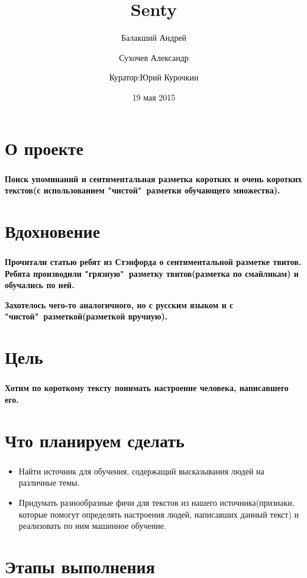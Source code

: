 \documentclass[t]{beamer}
\title{Senty}
\author{Балакший Андрей \and Сухочев Александр 
	\and \newline Куратор:Юрий Курочкин}
\date{19 мая 2015}
\institute[Computer Science Center]
\begin{document}
	\frame[plain]{\titlepage}
	
	
	\section{О проекте}
	\begin{frame}
		\frametitle{\insertsection}
		\textbf{Поиск упоминаний и сентиментальная разметка коротких и 	очень коротких текстов(с использованием "чистой"\ разметки обучающего множества).}
	\end{frame}
	
	
	\section{Вдохновение}
	\begin{frame}
		\frametitle{\insertsection}
		\textbf{Прочитали статью ребят из Стэнфорда о сентиментальной разметке твитов. Ребята производили "грязную"\ разметку твитов(разметка по смайликам) и обучались по ней.}\pause
		
		\textbf{Захотелось чего-то аналогичного, но с русским языком и с "чистой"\ разметкой(разметкой вручную).}
	\end{frame}
	
	
	\section{Цель}
	\begin{frame}
		\frametitle{\insertsection}
		\textbf{Хотим по короткому тексту понимать настроение человека, написавшего его.}
	\end{frame}
	
	
	\section{Что планируем сделать}
	\begin{frame}
		\frametitle{\insertsection}
		\begin{itemize}
			\item Найти источник для обучения, содержащий высказывания людей на различные темы.	
			\item Придумать разнообразные фичи для текстов из нашего источника(признаки, которые помогут определять настроения людей, написавших данный текст) и реализовать по ним машинное обучение.
		\end{itemize}
	\end{frame}
	
	
	\section{Этапы выполнения}
\end{document}
